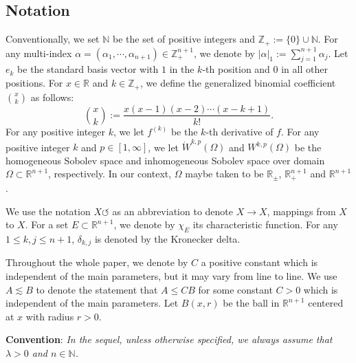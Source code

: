 \documentclass[12pt]{amsart}
\begin{document}
\subsection{Notation}
Conventionally, we set $\mathbb{N}$ be the set of positive integers and $\mathbb{Z}_+:=\{0\}\cup\mathbb{N}$. For any multi-index $\alpha=(\alpha_1,\cdots,\alpha_{n+1})\in\mathbb{Z}_+^{n+1}$, we denote by $|\alpha|_1:=\sum_{j=1}^{n+1}\alpha_j.$ Let $e_k$ be the standard basis vector with $1$ in the $k$-th position and $0$ in all other positions. For $x\in\mathbb{R}$ and $k\in\mathbb{Z}_+$, we define the generalized binomial coefficient $\binom{x}{k}$ as follows:
$$\binom{x}{k}:=\frac{x(x-1)(x-2)\cdots (x-k+1)}{k!}.$$
For any positive integer $k$, we let $f^{(k)}$ be the $k$-th derivative of $f$. For any positive integer $k$ and $p\in [1,\infty]$, we let $\dot{W}^{k,p}(\Omega)$ and $W^{k,p}(\Omega)$ be the homogeneous Sobolev space and inhomogeneous Sobolev space over domain $\Omega\subset \mathbb{R}^{n+1}$, respectively. In our context, $\Omega$ maybe taken to be $\mathbb{R}_\pm$, $\mathbb{R}_+^{n+1}$ and $\mathbb{R}^{n+1}$.

We use the notation $X\circlearrowleft$ as an abbreviation to denote $X\rightarrow X$, mappings from $X$ to $X$. For a set $E \subset \mathbb{R}^{n+1}$, we denote by $\chi_E$ its characteristic function. For any $1\leq k,j\leq n+1$, $\delta_{k,j}$ is denoted by the Kronecker delta.

Throughout the whole paper, we denote by $C$ a positive constant which is independent of the main parameters, but it may
vary from line to line. We use $A\lesssim B$ to denote the statement that $A\leq CB$ for some constant $C>0$ which is independent of the main parameters. Let $B(x,r)$ be the ball in $\mathbb{R}^{n+1}$ centered at $x$ with radius $r>0$.

{\bf Convention}: {\it In the sequel, unless otherwise {\color{blue}specified}, we always assume that $\lambda>0$ and $n\in \mathbb{N}$.}
\end{document}
